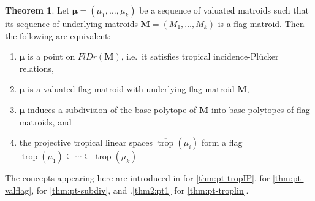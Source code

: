 \documentclass[11pt]{amsart}
\newcommand{\trop}{\operatorname{trop}}
\newcommand{\MM}{{\boldsymbol M}}
\newcommand{\bmu}{\boldsymbol \mu}
\theoremstyle{definition}
\newtheorem{maintheorem}{Theorem}
\begin{document}
\begin{maintheorem}
\label{thm:main}
Let $\bmu = (\mu_1, \ldots, \mu_k)$ be a sequence of valuated matroids such that its sequence of underlying matroids $\MM = (M_1, \ldots, M_k)$ is a flag matroid.  Then the following are equivalent:
\begin{enumerate}[label = (\alph*)]
\item \label{thm:pt-tropIP} $\bmu$ is a point on $FlDr(\MM)$, i.e.\ it satisfies tropical incidence-Pl\"ucker relations, 
\item \label{thm:pt-valflag} $\bmu$ is a valuated flag matroid  with underlying flag matroid $\MM$,
\item \label{thm:pt-subdiv} $\bmu$ induces a subdivision of the base polytope of $ \MM$ 
into base polytopes of flag matroids, and
\item \label{thm:pt-troplin} the projective tropical linear spaces $\overline{\trop}(\mu_i)$ form a flag $\overline{\trop}(\mu_1) \subseteq \cdots \subseteq \overline{\trop}(\mu_{k})$
\end{enumerate}
The concepts appearing here are introduced in  for \ref{thm:pt-tropIP},
 for \ref{thm:pt-valflag},  for \ref{thm:pt-subdiv}, and .\ref{thm2:pt1} for \ref{thm:pt-troplin}.
\end{maintheorem}


%
\end{document}
